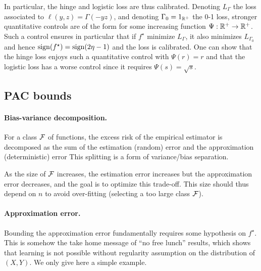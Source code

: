 In particular, the hinge and logistic loss are thus calibrated. 
% 
Denoting $L_\Gamma$ the loss associated to $\ell(y,z)=\Gamma(-yz)$, and denoting $\Gamma_0=1_{\mathbb{R}^+}$ the 0-1 loss, stronger quantitative controls are of the form  
for some increasing function $\Psi : \mathbb{R}^+ \rightarrow \mathbb{R}^+$. Such a control ensures in particular that if $f^\star$ minimize $L_{\Gamma}$, it also minimizes $L_{\Gamma_0}$ and hence $\operatorname{sign}(f^\star)=\operatorname{sign}(2\eta-1)$ and the loss is calibrated. 
%
One can show that the hinge loss enjoys such a quantitative control with $\Psi(r)=r$ and that the logistic loss has a worse control since it requires $\Psi(s)=\sqrt{s}$.


\subsection{PAC bounds}

\paragraph{Bias-variance decomposition.}

For a class $\mathcal{F}$ of functions, the excess risk of the empirical estimator
is decomposed as the sum of the estimation (random) error and the approximation (deterministic) error
This splitting is a form of variance/bias separation. 

As the size of $\mathcal{F}$ increases, the estimation error increases but the approximation error decreases, and the goal is to optimize this trade-off. This size should thus depend on $n$ to avoid over-fitting (selecting a too large class $\mathcal{F}$).

\paragraph{Approximation error.}

Bounding the approximation error fundamentally requires some hypothesis on $f^\star$. This is somehow the take home message of ``no free lunch'' results, which shows that learning is not possible without regularity assumption on the distribution of $(X,Y)$.
%
We only give here a simple example. 

